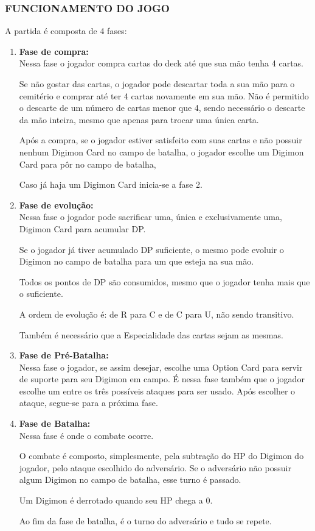 \documentclass[12pt,a4paper,brazil,abntex2]{article}
\begin{document}
		\subsubsection{\normalsize FUNCIONAMENTO DO JOGO}
			A partida é composta de 4 fases:
			\begin{enumerate}
				\item {\bf Fase de compra:}\\
					Nessa fase o jogador compra cartas do deck até que sua mão tenha 4 cartas.
					
					Se não gostar das cartas, o jogador pode descartar toda a sua mão para o cemitério e comprar até ter 4 cartas novamente em sua mão. Não é permitido o descarte de um número de cartas menor que 4, sendo necessário o descarte da mão inteira, mesmo que apenas para trocar uma única carta. 

					Após a compra, se o jogador estiver satisfeito com suas cartas e não possuir nenhum Digimon Card no campo de batalha, o jogador escolhe um Digimon Card para pôr no campo de batalha, 
					
					Caso já haja um Digimon Card inicia-se a fase 2.
				
				\item {\bf Fase de evolução:}\\
					Nessa fase o jogador pode sacrificar uma, única e exclusivamente uma, Digimon Card para acumular DP.
					
					Se o jogador já tiver acumulado DP suficiente, o mesmo pode evoluir o Digimon no campo de batalha para um que esteja na sua mão.
					
					Todos os pontos de DP  são consumidos, mesmo que o jogador tenha mais que o suficiente.

					A ordem de evolução é: de R para C e de C para U, não sendo transitivo. 
					
					Também é necessário que a Especialidade das cartas sejam as mesmas.
					
				\item {\bf Fase de Pré-Batalha:}\\
					Nessa fase o jogador, se assim desejar, escolhe uma Option Card para servir de suporte para seu Digimon em campo.
					É nessa fase também que o jogador escolhe um entre os três possíveis ataques para ser usado. Após escolher o ataque, segue-se para a próxima fase.
				
				\item {\bf Fase de Batalha:}\\
					Nessa fase é onde o combate ocorre. 
					
					O combate é composto, simplesmente, pela subtração do HP do Digimon do jogador, pelo ataque escolhido do adversário.
					Se o adversário não possuir algum Digimon no campo de batalha, esse turno é passado.

					Um Digimon é derrotado quando seu HP chega a 0.

					Ao fim da fase de batalha, é o turno do adversário e tudo se repete.
			\end{enumerate}
			
\end{document}
